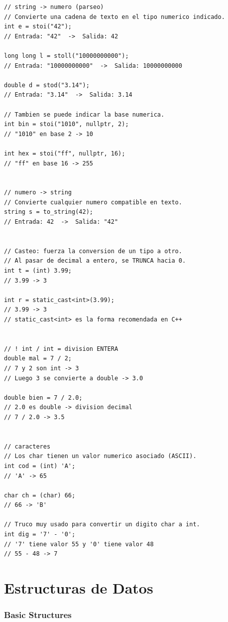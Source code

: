\documentclass[10pt,a4paper,twocolumn]{article}
\begin{document}
\begin{lstlisting}[style=cpp]
// string -> numero (parseo)
// Convierte una cadena de texto en el tipo numerico indicado.
int e = stoi("42");
// Entrada: "42"  ->  Salida: 42

long long l = stoll("10000000000");
// Entrada: "10000000000"  ->  Salida: 10000000000

double d = stod("3.14");
// Entrada: "3.14"  ->  Salida: 3.14

// Tambien se puede indicar la base numerica.
int bin = stoi("1010", nullptr, 2);
// "1010" en base 2 -> 10

int hex = stoi("ff", nullptr, 16);
// "ff" en base 16 -> 255


// numero -> string
// Convierte cualquier numero compatible en texto.
string s = to_string(42);
// Entrada: 42  ->  Salida: "42"


// Casteo: fuerza la conversion de un tipo a otro.
// Al pasar de decimal a entero, se TRUNCA hacia 0.
int t = (int) 3.99;
// 3.99 -> 3

int r = static_cast<int>(3.99);
// 3.99 -> 3
// static_cast<int> es la forma recomendada en C++


// ! int / int = division ENTERA
double mal = 7 / 2;
// 7 y 2 son int -> 3
// Luego 3 se convierte a double -> 3.0

double bien = 7 / 2.0;
// 2.0 es double -> division decimal
// 7 / 2.0 -> 3.5


// caracteres
// Los char tienen un valor numerico asociado (ASCII).
int cod = (int) 'A';
// 'A' -> 65

char ch = (char) 66;
// 66 -> 'B'

// Truco muy usado para convertir un digito char a int.
int dig = '7' - '0';
// '7' tiene valor 55 y '0' tiene valor 48
// 55 - 48 -> 7
\end{lstlisting}




\part{Estructuras de Datos}

\section{Basic Structures}
\end{document}
